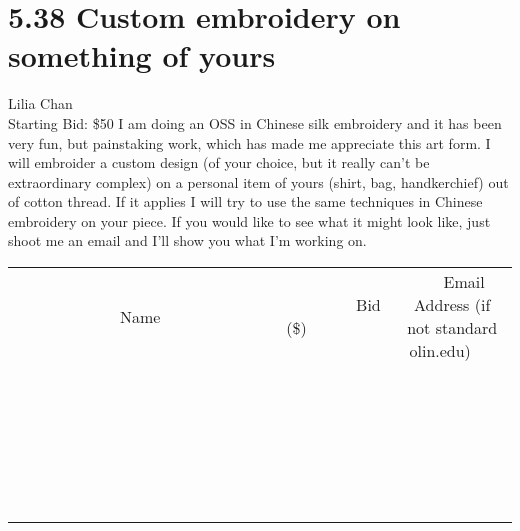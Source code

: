 \documentclass[11pt]{article}
\begin{document}
\section*{5.38 Custom embroidery on something of yours}
Lilia Chan
\\
Starting Bid: \$50
\newline
I am doing an OSS in Chinese silk embroidery and it has been very fun, but painstaking work, which has made me appreciate this art form. I will embroider a custom design (of your choice, but it really can't be extraordinary complex) on a personal item of yours (shirt, bag, handkerchief) out of cotton thread. If it applies I will try to use the same techniques in Chinese embroidery on your piece. If you would like to see what it might look like, just shoot me an email and I'll show you what I'm working on.
\\[6ex]
\begin{tabular}{c c c}
~~~~~~~~~~~~~Name~~~~~~~~~~~~~ & ~~~~~~~~~Bid (\$)~~~~~~~~~  & ~~~Email Address (if not standard olin.edu)~~~\\
 & & \\
\hline
 & & \\
\hline
 & & \\
\hline
 & & \\
\hline
 & & \\
\hline
 & & \\
\hline
 & & \\
\hline
 & & \\
\hline
 & & \\
\hline
 & & \\
\hline
 & & \\
\hline
 & & \\
\hline
 & & \\
\hline
 & & \\
\hline
 & & \\
\hline
 & & \\
\hline
 & & \\
\hline
 & & \\
\hline
 & & \\
\hline
 & & \\
\hline
 & & \\
\hline
 & & \\
\hline
 & & \\
\hline
 & & \\
\hline
 & & \\
\hline
 & & \\
\hline
\end{tabular}
\newpage
\end{document}
